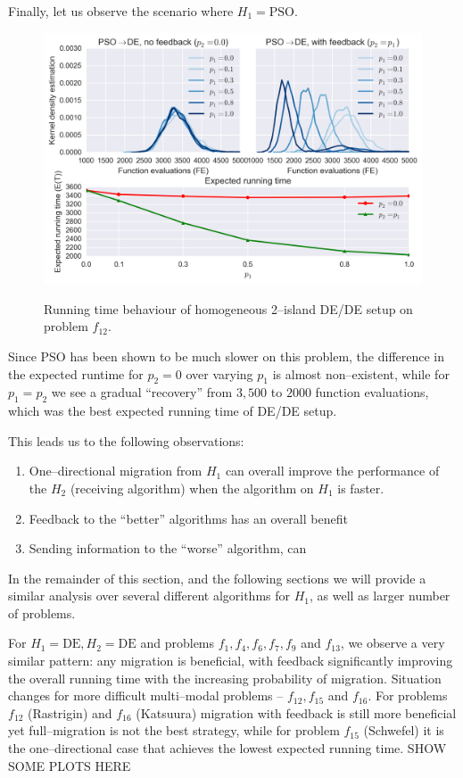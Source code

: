 \documentclass{sig-alternate}
\begin{document}
Finally, let us observe the scenario where $H_1 = \mbox{PSO}$.
\begin{figure}[ht]
  \centering
  \includegraphics[width=\columnwidth]{figures/single_pso_jde_cec_7.png}
  \label{fig:single_pso_jde_7}
 \caption{Running time behaviour of homogeneous 2--island DE/DE setup on problem $f_{12}$.}
\end{figure}
Since PSO has been shown to be much slower on this problem, the difference in the expected runtime for $p_2=0$ over varying $p_1$ is almost non--existent, while for $p_1=p_2$ we see a gradual ``recovery'' from $3,500$ to $2000$ function evaluations, which was the best expected running time of DE/DE setup.

This leads us to the following observations:
\begin{enumerate}
    \item One--directional migration from $H_1$ can overall improve the performance of the $H_2$ (receiving algorithm) when the algorithm on $H_1$ is faster.
    \item Feedback to the ``better'' algorithms has an overall benefit
    \item Sending information to the ``worse'' algorithm, can 
\end{enumerate}

In the remainder of this section, and the following sections we will provide a similar analysis over several different algorithms for $H_1$, as well as larger number of problems.

For $H_1 =\mbox{DE}, H_2=\mbox{DE}$ and problems $f_1, f_4, f_6, f_7, f_9$ and $f_{13}$, we observe a very similar pattern: any migration is beneficial, with feedback significantly improving the overall running time with the increasing probability of migration.
Situation changes for more difficult multi--modal problems -- $f_{12}, f_{15}$ and $f_{16}$.
For problems $f_{12}$ (Rastrigin) and $f_{16}$ (Katsuura) migration with feedback is still more beneficial yet full--migration is not the best strategy, while for problem $f_{15}$ (Schwefel) it is the one--directional case that achieves the lowest expected running time.
SHOW SOME PLOTS HERE
\end{document}
